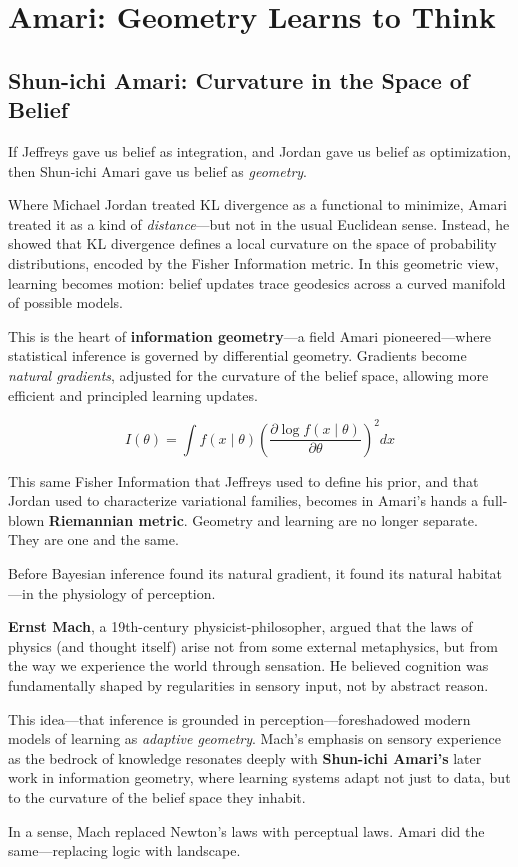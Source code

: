\section{Amari: Geometry Learns to Think}

\subsection{Shun-ichi Amari: Curvature in the Space of Belief}

If Jeffreys gave us belief as integration, and Jordan gave us belief as optimization, then Shun-ichi Amari gave us belief as \emph{geometry}.

Where Michael Jordan treated KL divergence as a functional to minimize, Amari treated it as a kind of \emph{distance}—but not in the usual Euclidean sense. Instead, he showed that KL divergence defines a local curvature on the space of probability distributions, encoded by the Fisher Information metric. In this geometric view, learning becomes motion: belief updates trace geodesics across a curved manifold of possible models.

This is the heart of \textbf{information geometry}—a field Amari pioneered—where statistical inference is governed by differential geometry. Gradients become \emph{natural gradients}, adjusted for the curvature of the belief space, allowing more efficient and principled learning updates.

\[
I(\theta) = \int f(x \mid \theta) \left( \frac{\partial \log f(x \mid \theta)}{\partial \theta} \right)^2 dx
\]

This same Fisher Information that Jeffreys used to define his prior, and that Jordan used to characterize variational families, becomes in Amari’s hands a full-blown \textbf{Riemannian metric}. Geometry and learning are no longer separate. They are one and the same.


\begin{tcolorbox}[colback=yellow!5!white, colframe=yellow!50!black, title=Ernst Mach and the Sensory Roots of Inference]
    Before Bayesian inference found its natural gradient, it found its natural habitat—in the physiology of perception.
    
    \textbf{Ernst Mach}, a 19th-century physicist-philosopher, argued that the laws of physics (and thought itself) arise not from some external metaphysics, but from the way we experience the world through sensation. He believed cognition was fundamentally shaped by regularities in sensory input, not by abstract reason.
    
    This idea—that inference is grounded in perception—foreshadowed modern models of learning as \emph{adaptive geometry}. Mach’s emphasis on sensory experience as the bedrock of knowledge resonates deeply with \textbf{Shun-ichi Amari’s} later work in information geometry, where learning systems adapt not just to data, but to the curvature of the belief space they inhabit.
    
    In a sense, Mach replaced Newton’s laws with perceptual laws.  
    Amari did the same—replacing logic with landscape.
\end{tcolorbox}


